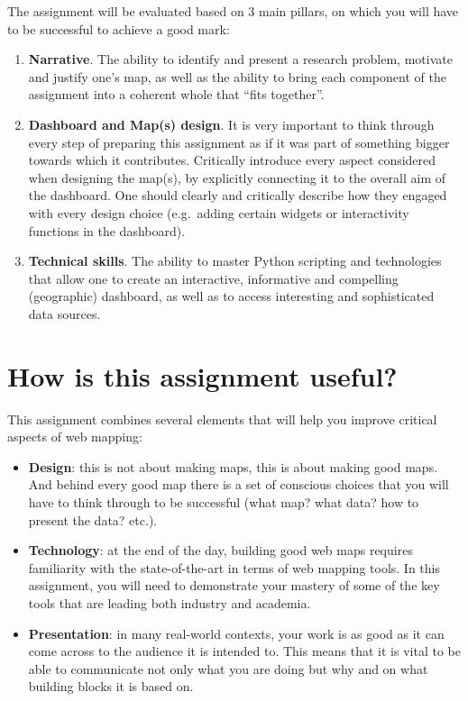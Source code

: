 \documentclass[
  letterpaper,
  DIV=11,
  numbers=noendperiod]{scrreprt}
\providecommand{\tightlist}{%
  \setlength{\itemsep}{0pt}\setlength{\parskip}{0pt}}\usepackage{longtable,booktabs,array}
\begin{document}

The assignment will be evaluated based on 3 main pillars, on which you
will have to be successful to achieve a good mark:

\begin{enumerate}
\def\labelenumi{\arabic{enumi}.}
\tightlist
\item
  \textbf{Narrative}. The ability to identify and present a research
  problem, motivate and justify one's map, as well as the ability to
  bring each component of the assignment into a coherent whole that
  ``fits together''.
\item
  \textbf{Dashboard and Map(s) design}. It is very important to think
  through every step of preparing this assignment as if it was part of
  something bigger towards which it contributes. Critically introduce
  every aspect considered when designing the map(s), by explicitly
  connecting it to the overall aim of the dashboard. One should clearly
  and critically describe how they engaged with every design choice
  (e.g.~adding certain widgets or interactivity functions in the
  dashboard).
\item
  \textbf{Technical skills}. The ability to master Python scripting and
  technologies that allow one to create an interactive, informative and
  compelling (geographic) dashboard, as well as to access interesting
  and sophisticated data sources.
\end{enumerate}

\section*{How is this assignment
useful?}\label{how-is-this-assignment-useful-1}


This assignment combines several elements that will help you improve
critical aspects of web mapping:

\begin{itemize}
\tightlist
\item
  \textbf{Design}: this is not about making maps, this is about making
  good maps. And behind every good map there is a set of conscious
  choices that you will have to think through to be successful (what
  map? what data? how to present the data? etc.).
\item
  \textbf{Technology}: at the end of the day, building good web maps
  requires familiarity with the state-of-the-art in terms of web mapping
  tools. In this assignment, you will need to demonstrate your mastery
  of some of the key tools that are leading both industry and academia.
\item
  \textbf{Presentation}: in many real-world contexts, your work is as
  good as it can come across to the audience it is intended to. This
  means that it is vital to be able to communicate not only what you are
  doing but why and on what building blocks it is based on.
\end{itemize}
\end{document}
